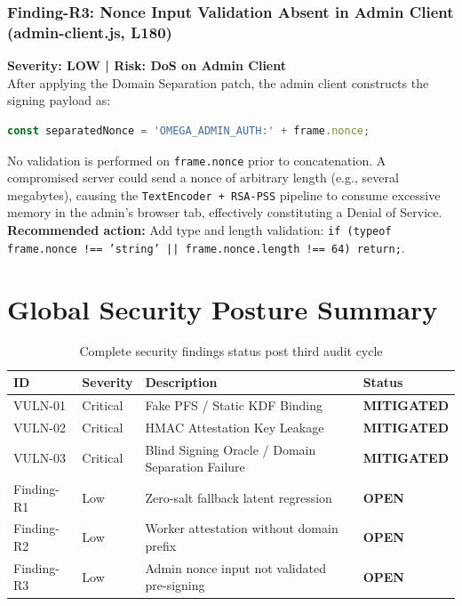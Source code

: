 \documentclass[12pt,a4paper]{article}
\begin{document}
\subsubsection{Finding-R3: Nonce Input Validation Absent in Admin Client (admin-client.js, L180)}

\begin{warningbox}
\textbf{Severity: LOW | Risk: DoS on Admin Client}\\
After applying the Domain Separation patch, the admin client constructs the signing payload as:
\begin{lstlisting}[language=JavaScript, numbers=none]
const separatedNonce = 'OMEGA_ADMIN_AUTH:' + frame.nonce;
\end{lstlisting}
No validation is performed on \texttt{frame.nonce} prior to concatenation. A compromised server could send a nonce of arbitrary length (e.g., several megabytes), causing the \texttt{TextEncoder + RSA-PSS} pipeline to consume excessive memory in the admin's browser tab, effectively constituting a Denial of Service. \textbf{Recommended action:} Add type and length validation: \texttt{if (typeof frame.nonce !== 'string' || frame.nonce.length !== 64) return;}.
\end{warningbox}

\section{Global Security Posture Summary}

\begin{table}[h!]
\centering
\begin{tabularx}{\textwidth}{llXl}
\toprule
\textbf{ID} & \textbf{Severity} & \textbf{Description} & \textbf{Status} \\
\midrule
VULN-01 & Critical & Fake PFS / Static KDF Binding & \textcolor{safegreen}{\textbf{MITIGATED}} \\
VULN-02 & Critical & HMAC Attestation Key Leakage & \textcolor{safegreen}{\textbf{MITIGATED}} \\
VULN-03 & Critical & Blind Signing Oracle / Domain Separation Failure & \textcolor{safegreen}{\textbf{MITIGATED}} \\
Finding-R1 & Low & Zero-salt fallback latent regression & \textcolor{warningyellow}{\textbf{OPEN}} \\
Finding-R2 & Low & Worker attestation without domain prefix & \textcolor{warningyellow}{\textbf{OPEN}} \\
Finding-R3 & Low & Admin nonce input not validated pre-signing & \textcolor{warningyellow}{\textbf{OPEN}} \\
\bottomrule
\end{tabularx}
\caption{Complete security findings status post third audit cycle}
\end{table}
\end{document}
